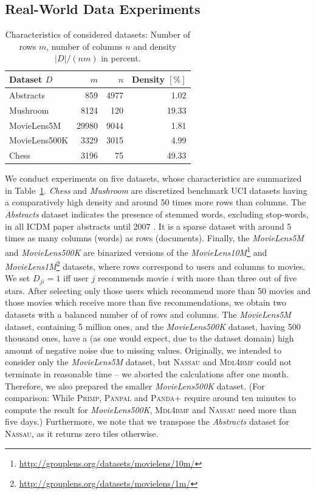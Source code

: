 \subsection{Real-World Data Experiments}\label{sec:MDL:RealWorld}
\begin{table} 
	\centering
	\begin{tabular}{lrrr}\toprule
    Dataset $D$ & $m$ & $n$ & Density $[\%]$\\ 
    \midrule
    Abstracts & 859 & 4977 & 1.02\\
    Mushroom & 8124 & 120 & 19.33\\
    MovieLens5M & 29980 &9044 &1.81\\
    MovieLens500K &3329 & 3015 & 4.99\\
    Chess & 3196 & 75 &49.33\\ \bottomrule
    \end{tabular}
    \caption{Characteristics of considered datasets: Number of rows $m$, number of columns $n$ and density $|D|/(nm)$ in percent.}
    \label{tbl:dataStats}
\end{table}
We conduct experiments on five datasets, whose characteristics are summarized in Table~\ref{tbl:dataStats}. \textit{Chess} and \textit{Mushroom} are discretized benchmark UCI datasets having a comparatively high density and around 50 times more rows than columns. The \textit{Abstracts} dataset indicates the presence of stemmed words, excluding stop-words, in all ICDM paper abstracts until 2007 \citep{deBie2011maximum}. It is a sparse dataset with around 5 times as many columns (words) as rows (documents). Finally, the \textit{MovieLens5M} and \textit{MovieLens500K} are binarized versions of the \textit{MovieLens10M}\footnote{\url{http://grouplens.org/datasets/movielens/10m/}} and \textit{MovieLens1M}\footnote{\url{http://grouplens.org/datasets/movielens/1m/}} datasets, where rows correspond to users and columns to movies. We set $D_{ji}=1$ iff user $j$ recommends movie $i$ with more than three out of five stars. After selecting only those users which recommend more than 50 movies and those movies which receive more than five recommendations, we obtain two datasets with a balanced number of of rows and columns. The \textit{MovieLens5M} dataset, containing 5 million ones, and the \textit{MovieLens500K} dataset, having 500 thousand ones, have a (as one would expect, due to the dataset domain) high amount of negative noise due to missing values. Originally, we intended to consider only the \textit{MovieLens5M} dataset, but \textsc{Nassau} and \textsc{Mdl4bmf} could not terminate in reasonable time -- we aborted the calculations after one month. Therefore, we also prepared the smaller \textit{MovieLens500K} dataset. (For comparison: While \textsc{Primp}, \textsc{Panpal} and \textsc{Panda+} require around ten minutes to compute the result for \textit{MovieLens500K}, \textsc{Mdl4bmf} and \textsc{Nassau} need more than five days.)  Furthermore, we note that we transpose the \textit{Abstracts} dataset for \textsc{Nassau}, as it returns zero tiles otherwise.


